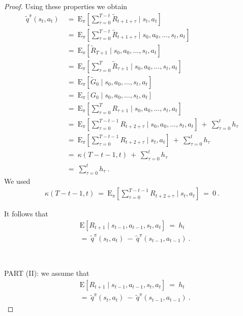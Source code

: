 \documentclass{article}
\newcommand\EXP{\mathbf{\mathrm{E}}}
\begin{document}
\begin{appendices}
\begin{proof}
Using these properties we obtain
\begin{align}
 \tilde{q}^{\pi}(s_t,a_t) \ 
 &= \ \EXP_{\pi} \left[
 \sum_{\tau=0}^{T-t} \tilde{R}_{t+1+\tau} \mid s_t,a_t \right] \\ \nonumber
 &= \ \EXP_{\pi} \left[
 \sum_{\tau=0}^{T-t} \tilde{R}_{t+1+\tau} \mid s_0,a_0,\ldots,s_t,a_t \right] \\ \nonumber
 &= \ \EXP_{\pi} \left[
 \tilde{R}_{T+1} \mid s_0,a_0,\ldots,s_t,a_t \right] \\ \nonumber
 &= \ \EXP_{\pi} \left[
 \sum_{\tau=0}^{T} \tilde{R}_{\tau+1} \mid s_0,a_0,\ldots,s_t,a_t \right] \\ \nonumber
  &= \ \EXP_{\pi} \left[
 \tilde{G}_0 \mid s_0,a_0,\ldots,s_t,a_t \right] \\ \nonumber
 &= \ \EXP_{\pi} \left[
 G_0 \mid s_0,a_0,\ldots,s_t, a_t\right] \\ \nonumber
  &= \ \EXP_{\pi} \left[
 \sum_{\tau=0}^{T} R_{\tau+1}  \mid s_0,a_0,\ldots,s_t, a_t\right] \\ \nonumber
   &= \ \EXP_{\pi} \left[
 \sum_{\tau=0}^{T-t-1} R_{t+2+\tau}  \mid s_0,a_0,\ldots,s_t, a_t\right] \ + \ 
 \sum_{\tau=0}^{t}  h_{\tau} \\ \nonumber
   &= \ \EXP_{\pi} \left[
 \sum_{\tau=0}^{T-t-1} R_{t+2+\tau}  \mid s_t, a_t\right] \ + \ 
 \sum_{\tau=0}^{t}  h_{\tau} \\ \nonumber
  &= \ \kappa(T-t-1,t)  \ + \ 
 \sum_{\tau=0}^{t} h_{\tau} \\ \nonumber
  &= \ \sum_{\tau=0}^{t}  h_{\tau} \ .
\end{align}
We used
\begin{align}
 \kappa(T-t-1,t) \ = \ \EXP_{\pi} \left[ \sum_{\tau=0}^{T-t-1} R_{t+2+\tau}  
  \mid s_t, a_t \right]  \ = \ 0 \ .
\end{align}

It follows that 
\begin{align}
 &\EXP \left[ R_{t+1} \mid s_{t-1},a_{t-1},s_t,a_t \right] 
    \ = \ h_t   \\ \nonumber 
    &= \ \tilde{q}^\pi(s_t,a_t) \ - \ \tilde{q}^\pi(s_{t-1},a_{t-1}) \ .
\end{align} 

~~\newline
~~\newline



PART (II): we assume that
\begin{align}
 &\EXP \left[ R_{t+1} \mid s_{t-1},a_{t-1},s_t,a_t \right] 
    \ = \ h_t   \\ \nonumber 
    &= \ \tilde{q}^\pi(s_t,a_t) \ - \ \tilde{q}^\pi(s_{t-1},a_{t-1}) \ .
\end{align} 


\end{proof}
\end{appendices}
\end{document}
